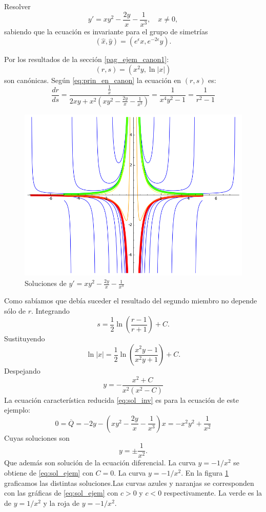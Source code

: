 \begin{ejemplo} Resolver
\[y'=xy^2-\frac{2y}{x}-\frac{1}{x^3},\quad x\neq 0,\]
sabiendo que la ecuación es invariante para el grupo de simetrías
\[(\hat{x},\hat{y})=(e^{\epsilon}x,e^{-2\epsilon}y).\]
\end{ejemplo}
Por los resultados de la sección \ref{pag_ejem_canon1}:
\[(r,s)=(x^2y,\ln|x|)\]
son canónicas. Según \eqref{eq:prin_en_canon} la ecuación en $(r,s)$ es:
\[\frac{dr}{ds}=\frac{\frac{1}{x}}{2xy+x^2\left(  xy^2-\frac{2y}{x}-\frac{1}{x^3}     \right)}=\frac{1}{x^4y^2-1}=\frac{1}{r^2-1}\]
\begin{figure}
\begin{center}
\includegraphics[scale=.3]{imagenes/SolGrup.png}
\caption{Soluciones de  $y'=xy^2-\frac{2y}{x}-\frac{1}{x^3}$}\label{fig:sol_met_lie}
\end{center}
\end{figure}
Como sabíamos que debía suceder el resultado del segundo miembro no depende sólo de $r$. Integrando
\[s=\frac12\ln\left( \frac{r-1}{r+1}  \right)+C.\]
Sustituyendo
\[\ln|x|=\frac12\ln\left( \frac{x^2y-1}{x^2y+1}  \right)+C.\]
Despejando
\begin{equation}\label{eq:sol_ejem}y =-\frac{x^2 + C}{x^2(x^2 - C)}\end{equation}
La ecuación característica reducida \eqref{eq:sol_inv} es para la ecuación de este ejemplo:
\[0=\overline{Q}=-2y- \left(xy^2-\frac{2y}{x}-\frac{1}{x^3}  \right)x=-x^2y^2+\frac{1}{x^2}\]
Cuyas soluciones son
\[y=\pm\frac{1}{x^2}.\]
Que además son solución de la ecuación diferencial. La curva $y=-1/x^2$ se obtiene de \eqref{eq:sol_ejem} con $C=0$. La  curva $y=-1/x^2$. En la figura \ref{fig:sol_met_lie} graficamos las distintas soluciones.Las curvas azules y naranjas se corresponden con las gráficas de \eqref{eq:sol_ejem} con $c>0$ y $c<0$ respectivamente. La verde es la de $y=1/x^2$ y la roja de $y=-1/x^2$.










